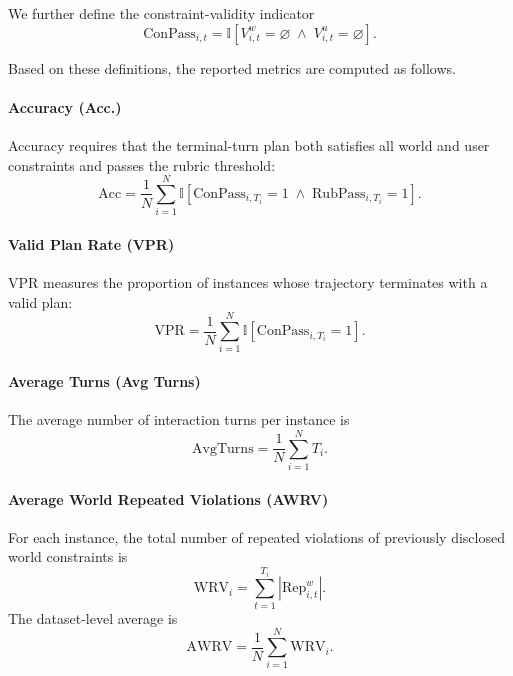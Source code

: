 \documentclass{llmxive}
\begin{document}
We further define the constraint-validity indicator
\begin{equation}
\mathrm{ConPass}_{i,t}
=
\mathbb{I}\!\left[
V_{i,t}^w = \varnothing \;\wedge\; V_{i,t}^u = \varnothing
\right].
\end{equation}

Based on these definitions, the reported metrics are computed as follows.

\paragraph{Accuracy (Acc.)}
Accuracy requires that the terminal-turn plan both satisfies all world and user constraints
and passes the rubric threshold:
\begin{equation}
\mathrm{Acc}
=
\frac{1}{N}\sum_{i=1}^{N}
\mathbb{I}\!\left[
\mathrm{ConPass}_{i,T_i}=1
\;\wedge\;
\mathrm{RubPass}_{i,T_i}=1
\right].
\end{equation}

\paragraph{Valid Plan Rate (VPR)}
VPR measures the proportion of instances whose trajectory terminates with a valid plan:
\begin{equation}
\mathrm{VPR}
=
\frac{1}{N}\sum_{i=1}^{N}
\mathbb{I}\!\left[
\mathrm{ConPass}_{i,T_i}=1
\right].
\end{equation}

\paragraph{Average Turns (Avg Turns)}
The average number of interaction turns per instance is
\begin{equation}
\mathrm{AvgTurns}
=
\frac{1}{N}\sum_{i=1}^{N} T_i.
\end{equation}

\paragraph{Average World Repeated Violations (AWRV)}
For each instance, the total number of repeated violations of previously disclosed world constraints is
\begin{equation}
\mathrm{WRV}_i
=
\sum_{t=1}^{T_i} \left| \mathrm{Rep}_{i,t}^w \right|.
\end{equation}
The dataset-level average is
\begin{equation}
\mathrm{AWRV}
=
\frac{1}{N}\sum_{i=1}^{N} \mathrm{WRV}_i.
\end{equation}
\end{document}
